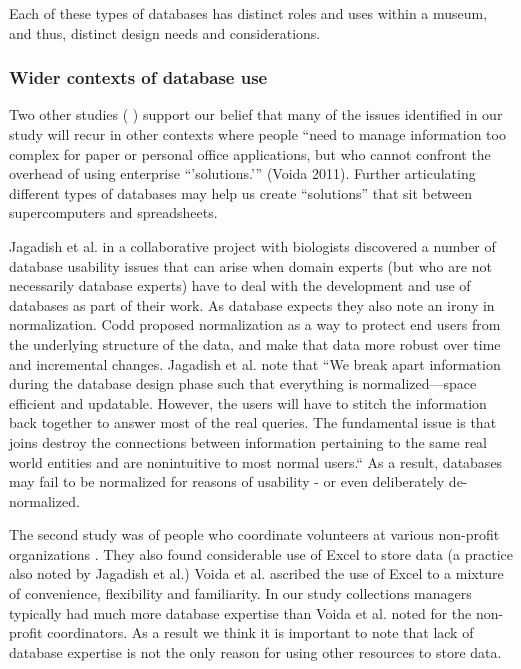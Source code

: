 Each of these types of databases has distinct roles and uses within a museum, and thus, distinct design needs and considerations. 

\subsubsection{Wider contexts of database use}

Two other studies (\cite{jagadish2007making}  \cite{voida2011homebrew}) support our belief that many of the issues identified in our study will recur in other contexts where people “need to manage information too complex for paper or personal office applications, but who cannot confront the overhead of using enterprise “’solutions.’” (Voida 2011). Further articulating different types of databases may help us create “solutions” that sit between supercomputers and spreadsheets.

Jagadish et al. \cite{jagadish2007making} in a collaborative project with biologists discovered a number of database usability issues that can arise when domain experts (but who are not necessarily  database experts) have to deal with the development and use of databases as part of their work.  As database expects they also note an irony in normalization. Codd proposed normalization as a way to protect end users from the underlying structure of the data, and make that data more robust over time and incremental changes. Jagadish et al. note that “We break apart information during the database design phase such that everything is normalized—space efficient and updatable. However, the users will have to stitch the information back together to answer most of the real queries. The fundamental issue is that joins destroy the connections between information pertaining to the same real world entities and are nonintuitive to most normal users.“ As a result, databases may fail to be normalized for reasons of usability - or even deliberately de-normalized.

The second study was of people who coordinate volunteers at various non-profit organizations \cite{voida2011homebrew}. They also found considerable use of Excel to store data (a practice also noted by Jagadish et al.) Voida et al. ascribed the use of Excel to a mixture of convenience, flexibility and familiarity. In our study collections managers typically had much more database expertise than Voida et al. noted for the non-profit coordinators. As a result we think it is important to note that lack of database expertise is not the only reason for using other resources to store data.

